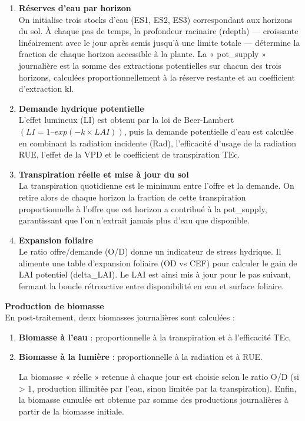 \documentclass[
]{article}
\begin{document}
\begin{enumerate}
\def\labelenumi{\arabic{enumi}.}
\item
  \textbf{Réserves d'eau par horizon\\
  }On initialise trois stocks d'eau (ES1, ES2, ES3) correspondant aux
  horizons du sol. À chaque pas de temps, la profondeur racinaire
  (rdepth) --- croissante linéairement avec le jour après semis jusqu'à
  une limite totale --- détermine la fraction de chaque horizon
  accessible à la plante. La « pot\_supply » journalière est la somme
  des extractions potentielles sur chacun des trois horizons, calculées
  proportionnellement à la réserve restante et au coefficient
  d'extraction kl.
\item
  \textbf{Demande hydrique potentielle\\
  }L'effet lumineux (LI) est obtenu par la loi de Beer-Lambert
  \((LI = 1 – exp(-k × LAI))\), puis la demande potentielle d'eau est
  calculée en combinant la radiation incidente (Rad), l'efficacité
  d'usage de la radiation RUE, l'effet de la VPD et le coefficient de
  transpiration TEc.
\item
  \textbf{Transpiration réelle et mise à jour du sol\\
  }La transpiration quotidienne est le minimum entre l'offre et la
  demande. On retire alors de chaque horizon la fraction de cette
  transpiration proportionnelle à l'offre que cet horizon a contribué à
  la pot\_supply, garantissant que l'on n'extrait jamais plus d'eau que
  disponible.
\item
  \textbf{Expansion foliaire\\
  }Le ratio offre/demande (O/D) donne un indicateur de stress hydrique.
  Il alimente une table d'expansion foliaire (OD vs CEF) pour calculer
  le gain de LAI potentiel (delta\_LAI). Le LAI est ainsi mis à jour
  pour le pas suivant, fermant la boucle rétroactive entre disponibilité
  en eau et surface foliaire.
\end{enumerate}

\textbf{Production de biomasse\\
}En post-traitement, deux biomasses journalières sont calculées :

\begin{enumerate}
\def\labelenumi{\arabic{enumi}.}
\item
  \textbf{Biomasse à l'eau} : proportionnelle à la transpiration et à
  l'efficacité TEc,
\item
  \textbf{Biomasse à la lumière} : proportionnelle à la radiation et à
  RUE.

  La biomasse « réelle » retenue à chaque jour est choisie selon le
  ratio O/D (si \textgreater{} 1, production illimitée par l'eau, sinon
  limitée par la transpiration). Enfin, la biomasse cumulée est obtenue
  par somme des productions journalières à partir de la biomasse
  initiale.
\end{enumerate}
\end{document}
